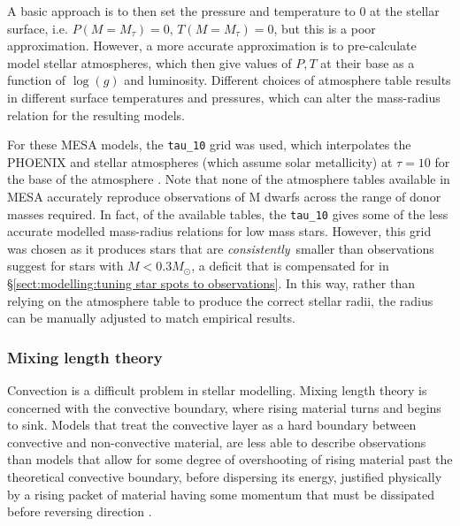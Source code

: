 A basic approach is to then set the pressure and temperature to 0 at the stellar surface, i.e. $P(M = M_\tau) = 0$, $T(M = M_\tau) = 0$, but this is a poor approximation.
However, a more accurate approximation is to pre-calculate model stellar atmospheres, which then give values of $P, T$ at their base as a function of $\log(g)$ and luminosity.
Different choices of atmosphere table results in different surface temperatures and pressures, which can alter the mass-radius relation for the resulting models.

For these MESA models, the \lstinline{tau_10} grid was used, which interpolates the PHOENIX \citep{hauschildt1999, hauschildt2001} and \citet{castelli2003} stellar atmospheres (which assume solar metallicity) at $\tau = 10$ for the base of the atmosphere \citep{paxton2010,paxton2011}.
Note that none of the atmosphere tables available in MESA accurately reproduce observations of M dwarfs across the range of donor masses required. In fact, of the available tables, the \lstinline{tau_10} gives some of the less accurate modelled mass-radius relations for low mass stars.
However, this grid was chosen as it produces stars that are {\it consistently}\ smaller than observations suggest for stars with $M < 0.3 M_\odot$, a deficit that is compensated for in \S\ref{sect:modelling:tuning star spots to observations}. In this way, rather than relying on the atmosphere table to produce the correct stellar radii, the radius can be manually adjusted to match empirical results.


\subsubsection{Mixing length theory}

Convection is a difficult problem in stellar modelling.
Mixing length theory is concerned with the convective boundary, where rising material turns and begins to sink.
Models that treat the convective layer as a hard boundary between convective and non-convective material, are less able to describe observations than models that allow for some degree of overshooting of rising material past the theoretical convective boundary, before dispersing its energy, justified physically by a rising packet of material having some momentum that must be dissipated before reversing direction \citep{prandtl1925,bradshaw1974}.

